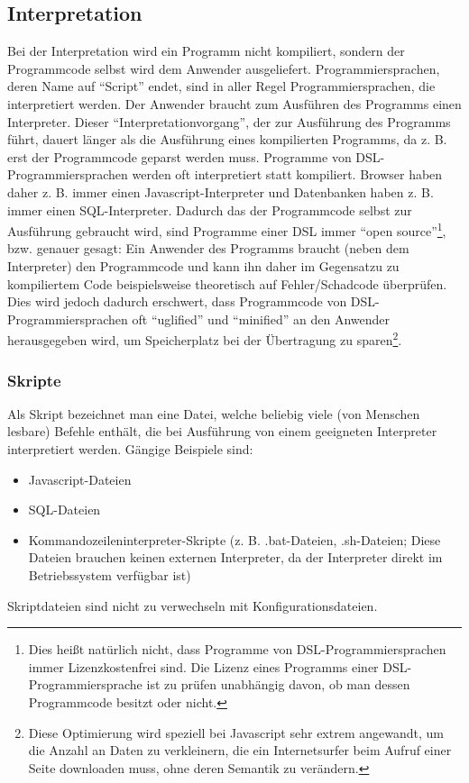 \begin{multicols}{3}
\subsection{Interpretation}
Bei der Interpretation wird ein Programm nicht kompiliert, sondern der Programmcode selbst wird dem Anwender ausgeliefert. Programmiersprachen, deren Name auf \enquote{Script} endet, sind in aller Regel Programmiersprachen, die interpretiert werden. Der Anwender braucht zum Ausführen des Programms einen Interpreter. Dieser \enquote{Interpretationvorgang}, der zur Ausführung des Programms führt, dauert länger als die Ausführung eines kompilierten Programms, da z. B. erst der Programmcode geparst werden muss. Programme von DSL-Programmiersprachen werden oft interpretiert statt kompiliert. Browser haben daher z. B. immer einen Javascript-Interpreter und Datenbanken haben z. B.  immer einen SQL-Interpreter. Dadurch das der Programmcode selbst zur Ausführung gebraucht wird, sind Programme einer DSL immer \enquote{open source}\footnote{Dies heißt natürlich nicht, dass Programme von DSL-Programmiersprachen immer Lizenzkostenfrei sind. Die Lizenz eines Programms einer DSL-Programmiersprache ist zu prüfen unabhängig davon, ob man dessen Programmcode besitzt oder nicht.}, bzw. genauer gesagt: Ein Anwender des Programms braucht (neben dem Interpreter) den Programmcode und kann ihn daher im Gegensatzu zu kompiliertem Code beispielsweise theoretisch auf Fehler/Schadcode überprüfen. Dies wird jedoch dadurch erschwert, dass Programmcode von DSL-Programmiersprachen oft \enquote{uglified} und \enquote{minified} an den Anwender herausgegeben wird, um Speicherplatz bei der Übertragung zu sparen\footnote{Diese Optimierung wird speziell bei Javascript sehr extrem angewandt, um die Anzahl an Daten zu verkleinern, die ein Internetsurfer beim Aufruf einer Seite downloaden muss, ohne deren Semantik zu verändern.}.
\subsubsection{Skripte}
Als Skript bezeichnet man eine Datei, welche beliebig viele (von Menschen lesbare) Befehle enthält, die bei Ausführung von einem geeigneten Interpreter interpretiert werden. Gängige Beispiele sind:\\
\begin{itemize}
\item Javascript-Dateien
\item SQL-Dateien
\item Kommandozeileninterpreter-Skripte (z. B. .bat-Dateien, .sh-Dateien; Diese Dateien brauchen keinen externen Interpreter, da der Interpreter direkt im Betriebssystem verfügbar ist)
\end{itemize}
Skriptdateien sind nicht zu verwechseln mit Konfigurationsdateien.

\end{multicols}
